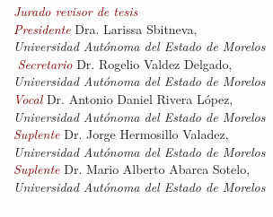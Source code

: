 



\textcolor{white}{g}\hspace{2.5cm}\textcolor{Maroon}{\textit{Jurado revisor de tesis}}\\
\textcolor{white}{g}\hspace{2.8cm}\textcolor{Maroon}{\large \textit{Presidente}} Dra. Larissa Sbitneva,\\
\textcolor{white}{g}\hspace{2.8cm}\textit{Universidad Autónoma del Estado de Morelos}\\
\textcolor{white}{g}\hspace{2.8cm}\textcolor{Maroon}{\large \textit{ Secretario}} Dr. Rogelio Valdez Delgado,\\
\textcolor{white}{g}\hspace{2.8cm}\textit{Universidad Autónoma del Estado de Morelos}\\
\textcolor{white}{g}\hspace{2.8cm}\textcolor{Maroon}{\large \textit{Vocal}} Dr. Antonio Daniel Rivera López,\\
\textcolor{white}{g}\hspace{2.8cm}\textit{Universidad Autónoma del Estado de Morelos}\\
\textcolor{white}{g}\hspace{2.8cm}\textcolor{Maroon}{\large \textit{Suplente}} Dr. Jorge Hermosillo Valadez,\\
\textcolor{white}{g}\hspace{2.8cm}\textit{Universidad Autónoma del Estado de Morelos}\\
\textcolor{white}{g}\hspace{2.8cm}\textcolor{Maroon}{\large \textit{Suplente}} Dr. Mario Alberto Abarca Sotelo,\\
\textcolor{white}{g}\hspace{2.8cm}\textit{Universidad Autónoma del Estado de Morelos}\\
\textcolor{white}{rerf}\\
\\
\\

{
	\centering
	\doclicenseThis
}